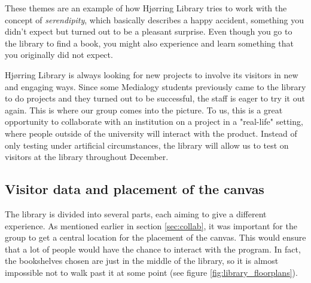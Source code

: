 These themes are an example of how Hj{\o}rring Library tries to work with the concept of \textit{serendipity}, which basically describes a happy accident, something you didn't expect but turned out to be a pleasant surprise. Even though you go to the library to find a book, you might also experience and learn something that you originally did not expect.

Hj{\o}rring Library is always looking for new projects to involve its visitors in new and engaging ways. Since some Medialogy students previously came to the library to do projects and they turned out to be successful, the staff is eager to try it out again. This is where our group comes into the picture. To us, this is a great opportunity to collaborate with an institution on a project in a "real-life" setting, where people outside of the university will interact with the product. Instead of only testing under artificial circumstances, the library will allow us to test on visitors at the library throughout December.

\subsection{Visitor data and placement of the canvas}
The library is divided into several parts, each aiming to give a different experience. As mentioned earlier in section \ref{sec:collab}, it was important for the group to get a central location for the placement of the canvas. This would ensure that a lot of people would have the chance to interact with the program. In fact, the bookshelves chosen are just in the middle of the library, so it is almost impossible not to walk past it at some point (see figure \ref{fig:library_floorplans}).

